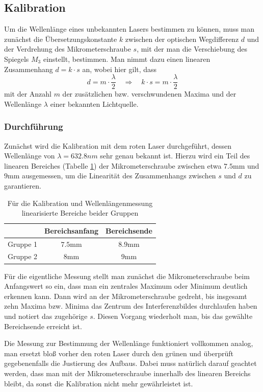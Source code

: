 \documentclass[a4paper, 11pt]{article}
\begin{document}
\subsection{Kalibration}
Um die Wellenlänge eines unbekannten Lasers bestimmen zu können, muss man zunächst die Übersetzungskonstante $k$ zwischen der optischen Wegdifferenz $d$ und der Verdrehung des Mikrometerschraube $s$, mit der man die Verschiebung des Spiegels $M_3$ einstellt, bestimmen. Man nimmt dazu einen linearen Zusammenhang $d = k \cdot s$ an, wobei hier gilt, dass 
\begin{equation}
d = m \cdot \frac{\lambda}{2} \quad \Rightarrow \quad k \cdot s = m \cdot \frac{\lambda}{2}
\end{equation}  
mit der Anzahl $m$ der zusätzlichen bzw. verschwundenen Maxima und der Wellenlänge $\lambda$ einer bekannten Lichtquelle.

\subsubsection{Durchführung}
Zunächst wird die Kalibration mit dem roten Laser durchgeführt, dessen Wellenlänge von $\lambda = 632.8 nm$ sehr genau bekannt ist. Hierzu wird ein Teil des linearen Bereiches (Tabelle \ref{table:lin_Bereich}) der Mikrometerschraube zwischen etwa $7.5$mm und $9$mm ausgemessen, um die Linearität des Zusammenhangs zwischen $s$ und $d$ zu garantieren.
\begin{table}[H]
	\large
	\centering
	\begin{tabular}{|c|c|c|}
		\hline 	&	Bereichsanfang	&	Bereichsende	\\
		\hline	Gruppe 1	&	$ 7.5\mathrm{mm}$		&	$ 8.9\mathrm{mm}$ \\
		\hline  Gruppe 2	&	$ 8\mathrm{mm} $		&	$ 9\mathrm{mm}$ \\
		\hline
	\end{tabular}
	\caption{Für die Kalibration und Wellenlängenmessung linearisierte Bereiche beider Gruppen}
	\label{table:lin_Bereich}
\end{table}
Für die eigentliche Messung stellt man zunächst die Mikrometerschraube beim Anfangswert so ein, dass man ein zentrales Maximum oder Minimum deutlich erkennen kann. Dann wird an der Mikrometerschraube gedreht, bis insgesamt zehn Maxima bzw. Minima das Zentrum des Interferenzbildes durchlaufen haben und notiert das zugehörige $s$. Diesen Vorgang wiederholt man, bis das gewählte Bereichsende erreicht ist.

Die Messung zur Bestimmung der Wellenlänge funktioniert vollkommen analog, man ersetzt bloß vorher den roten Laser durch den grünen und überprüft gegebenenfalls die Justierung des Aufbaus. Dabei muss natürlich darauf geachtet werden, dass man mit der Mikrometerschraube innerhalb des linearen Bereichs bleibt, da sonst die Kalibration nicht mehr gewährleistet ist.
\end{document}
